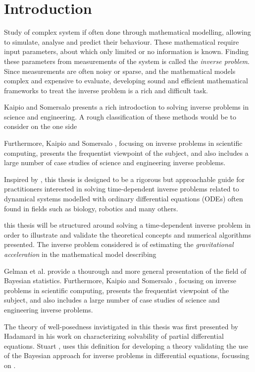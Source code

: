 \section{Introduction}
\setcounter{page}{1}
\thispagestyle{empty}

Study of complex system if often done through mathematical modelling, allowing to simulate, analyse and predict their behaviour. These mathematical require input parameters, about which only limited or no information is known. Finding these parameters from measurements of the system is called the \textit{inverse problem}. Since measurements are often noisy or sparse, and the mathematical models complex and expensive to evaluate, developing sound and efficient mathematical frameworks to treat the inverse problem is a rich and difficult task.

Kaipio and Somersalo \cite{kaipio2006statistical} presents a rich introdoction to solving inverse problems in science and engineering. A rough classification of these methods would be to consider on the one side 

Furthermore, Kaipio and Somersalo \cite{kaipio2006statistical}, focusing on inverse problems in scientific computing, presents the frequentist viewpoint of the subject, and  also includes a large number of case studies of science and engineering inverse problems.


Inspired by \cite{bayes-tutorial}, this thesis is designed to be a rigorous but approachable guide for practitioners interested in solving time-dependent inverse problems related to dynamical systems modelled with ordinary differential equations (ODEs) often found in fields such as biology, robotics and many others.


this thesis will be structured around  solving a time-dependent inverse problem in order to illustrate and validate the theoretical concepts and numerical algorithms presented. The inverse problem considered is of estimating the \textit{gravitational acceleration} in the mathematical model describing 

Gelman et al. \cite{gelman} provide a thourough and more general presentation of the field of Bayesian statistics. Furthermore, Kaipio and Somersalo \cite{kaipio2006statistical}, focusing on inverse problems in scientific computing, presents the frequentist viewpoint of the subject, and  also includes a large number of case studies of science and engineering inverse problems.

The theory of well-posedness invistigated in this thesis was first presented by Hadamard \cite{hadamard} in his work on characterizing solvability of partial differential equations. Stuart \cite{stuart_2010}, uses this definition for developing a theory validating the use of the Bayesian approach for inverse problems in differential equations, focussing on .

